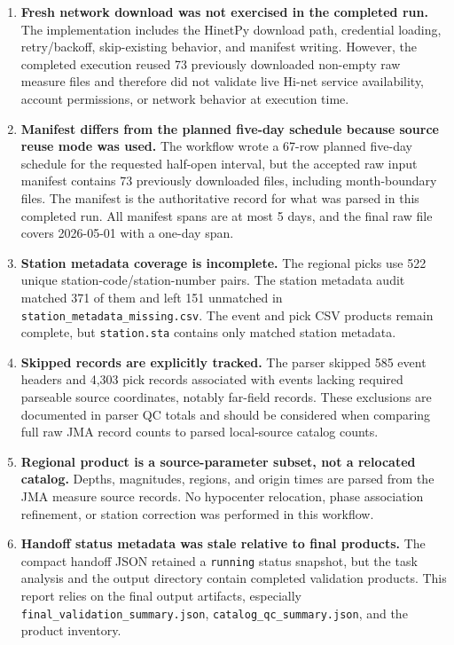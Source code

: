 \documentclass[11pt]{article}
\begin{document}
\begin{enumerate}
  \item \textbf{Fresh network download was not exercised in the completed run.}  The implementation includes the HinetPy download path, credential loading, retry/backoff, skip-existing behavior, and manifest writing.  However, the completed execution reused 73 previously downloaded non-empty raw measure files and therefore did not validate live Hi-net service availability, account permissions, or network behavior at execution time.
  \item \textbf{Manifest differs from the planned five-day schedule because source reuse mode was used.}  The workflow wrote a 67-row planned five-day schedule for the requested half-open interval, but the accepted raw input manifest contains 73 previously downloaded files, including month-boundary files.  The manifest is the authoritative record for what was parsed in this completed run.  All manifest spans are at most 5 days, and the final raw file covers 2026-05-01 with a one-day span.
  \item \textbf{Station metadata coverage is incomplete.}  The regional picks use 522 unique station-code/station-number pairs.  The station metadata audit matched 371 of them and left 151 unmatched in \texttt{station\_metadata\_missing.csv}.  The event and pick CSV products remain complete, but \texttt{station.sta} contains only matched station metadata.
  \item \textbf{Skipped records are explicitly tracked.}  The parser skipped 585 event headers and 4,303 pick records associated with events lacking required parseable source coordinates, notably far-field records.  These exclusions are documented in parser QC totals and should be considered when comparing full raw JMA record counts to parsed local-source catalog counts.
  \item \textbf{Regional product is a source-parameter subset, not a relocated catalog.}  Depths, magnitudes, regions, and origin times are parsed from the JMA measure source records.  No hypocenter relocation, phase association refinement, or station correction was performed in this workflow.
  \item \textbf{Handoff status metadata was stale relative to final products.}  The compact handoff JSON retained a \texttt{running} status snapshot, but the task analysis and the output directory contain completed validation products.  This report relies on the final output artifacts, especially \texttt{final\_validation\_summary.json}, \texttt{catalog\_qc\_summary.json}, and the product inventory.
\end{enumerate}
\end{document}
